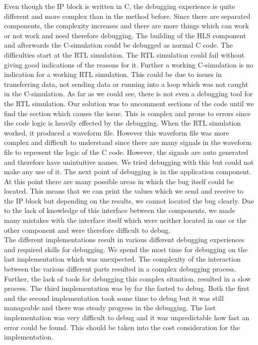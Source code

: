 \documentclass[conference]{IEEEtran}
\begin{document}
Even though the IP block is written in C, the debugging experience is quite different and more complex than in the method before. Since there are separated components, the complexity increases and there are more things which can work or not work and need therefore debugging. The building of the HLS component and afterwards the C-simulation could be debugged as normal C code. The difficulties start at the RTL simulation. The RTL simulation could fail without giving good indications of the reasons for it. Further a working C-simulation is no indication for a working RTL simulation. This could be due to issues in transferring data, not sending data or running into a loop which was not caught in the C-simulation. As far as we could see, there is not even a debugging tool for the RTL simulation. Our solution was to uncomment sections of the code until we find the section which causes the issue. This is complex and prone to errors since the code logic is heavily effected by the debugging. When the RTL simulation worked, it produced a waveform file. However this waveform file was more complex and difficult to understand since there are many signals in the waveform file to represent the logic of the C code. However, the signals are auto generated and therefore have unintuitive names. We tried debugging with this but could not make any use of it. The next point of debugging is in the application component. At this point there are many possible areas in which the bug itself could be located. This means that we can print the values which we send and receive to the IP block but depending on the results, we cannot located the bug clearly. Due to the lack of knowledge of this interface between the components, we made many mistakes with the interface itself which were neither located in one or the other component and were therefore difficult to debug. \\
The different implementations result in various different debugging experiences and required skills for debugging. We spend the most time for debugging on the last implementation which was unexpected. The complexity of the interaction between the various different parts resulted in a complex debugging process. Further, the lack of tools for debugging this complex situation, resulted in a slow process. The third implementation was by far the fasted to debug. Both the first and the second implementation took some time to debug but it was still manageable and there was steady progress in the debugging. The last implementation was very difficult to debug and it was unpredictable how fast an error could be found. This should be taken into the cost consideration for the implementation.
\end{document}
